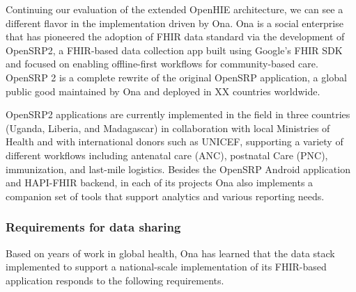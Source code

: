 \documentclass[
  authoryear]{elsarticle}
\begin{document}
Continuing our evaluation of the extended OpenHIE architecture, we can
see a different flavor in the implementation driven by Ona. Ona is a
social enterprise that has pioneered the adoption of FHIR data standard
via the development of OpenSRP2, a FHIR-based data collection app built
using Google's FHIR SDK and focused on enabling offline-first workflows
for community-based care. OpenSRP 2 is a complete rewrite of the
original OpenSRP application, a global public good maintained by Ona and
deployed in XX countries worldwide.

OpenSRP2 applications are currently implemented in the field in three
countries (Uganda, Liberia, and Madagascar) in collaboration with local
Ministries of Health and with international donors such as UNICEF,
supporting a variety of different workflows including antenatal care
(ANC), postnatal Care (PNC), immunization, and last-mile logistics.
Besides the OpenSRP Android application and HAPI-FHIR backend, in each
of its projects Ona also implements a companion set of tools that
support analytics and various reporting needs.

\subsubsection{Requirements for data
sharing}\label{requirements-for-data-sharing}

Based on years of work in global health, Ona has learned that the data
stack implemented to support a national-scale implementation of its
FHIR-based application responds to the following requirements.
\end{document}
